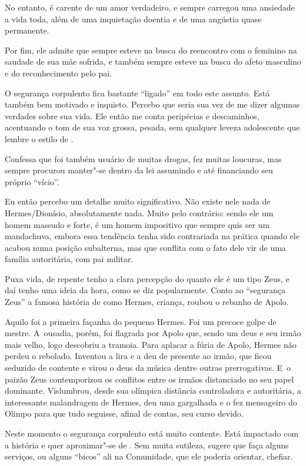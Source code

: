 No entanto,  é carente de um amor verdadeiro, e sempre carregou uma
ansiedade a vida toda, além de uma inquietação doentia e de uma angústia
quase permanente.

Por fim, ele admite que sempre esteve na busca do reencontro com o
feminino na saudade de sua mãe sofrida, e também sempre esteve na busca
do afeto masculino e do reconhecimento pelo pai.

\asterisc{}

O segurança corpulento fica bastante ``ligado'' em todo este assunto.
Está também bem motivado e inquieto. Percebo que seria sua vez de me
dizer algumas verdades sobre sua vida. Ele então me conta peripécias e
descaminhos, acentuando o tom de sua voz grossa, pesada, sem qualquer
leveza adolescente que lembre o estilo de .

Confessa que foi também usuário de muitas drogas, fez muitas loucuras,
mas sempre procurou manter"-se dentro da lei assumindo e até financiando
seu próprio ``vício''.

Eu então percebo um detalhe muito significativo. Não existe nele nada de
Hermes/Dionísio, absolutamente nada. Muito pelo contrário: sendo ele um
homem massudo e forte, é um homem impositivo que sempre quis ser um
mandachuva, embora essa tendência tenha sido contrariada na prática
quando ele acabou numa posição subalterna, mas que conflita com o fato
dele vir de uma família autoritária, com pai militar.

Puxa vida, de repente tenho a clara percepção do quanto ele é um tipo
Zeus, e daí tenho uma ideia da hora, como se diz popularmente. Conto ao
``segurança Zeus'' a famosa história de como Hermes, criança, roubou o
rebanho de Apolo.

Aquilo foi a primeira façanha do pequeno Hermes. Foi um precoce golpe de
mestre. A~ousadia, porém, foi flagrada por Apolo que, sendo um deus e
seu irmão mais velho, logo descobriu a tramoia. Para aplacar a fúria de
Apolo, Hermes não perdeu o rebolado. Inventou a lira e a deu de presente
ao irmão, que ficou seduzido de contente e virou o deus da música dentre
outras prerrogativas. E~o paizão Zeus contemporizou os conflitos entre
os irmãos distanciado no seu papel dominante. Vislumbrou, desde sua
olímpica distância controladora e autoritária, a interessante
malandragem de Hermes, deu uma gargalhada e o fez mensageiro do Olimpo
para que tudo seguisse, afinal de contas, seu curso devido.

Neste momento o segurança corpulento está muito contente. Está impactado
com a história e quer aproximar"-se de . Sem muita sutileza, sugere que
 faça alguns serviços, ou alguns ``bicos'' ali na Comunidade, que ele
poderia orientar, chefiar.

